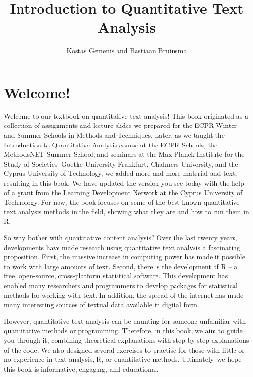 \documentclass[
]{book}
\title{Introduction to Quantitative Text Analysis}
\author{Kostas Gemenis and Bastiaan Bruinsma}
\date{}
\begin{document}
\maketitle

{
\setcounter{tocdepth}{1}
\tableofcontents
}
\chapter*{Welcome!}\label{welcome}

Welcome to our textbook on quantitative text analysis! This book originated as a collection of assignments and lecture slides we prepared for the ECPR Winter and Summer Schools in Methods and Techniques. Later, as we taught the Introduction to Quantitative Analysis course at the ECPR Schools, the MethodsNET Summer School, and seminars at the Max Planck Institute for the Study of Societies, Goethe University Frankfurt, Chalmers University, and the Cyprus University of Technology, we added more and more material and text, resulting in this book. We have updated the version you see today with the help of a grant from the \href{https://ldn.cut.ac.cy/}{Learning Development Network} at the Cyprus University of Technology. For now, the book focuses on some of the best-known quantitative text analysis methods in the field, showing what they are and how to run them in R.

So why bother with quantitative content analysis? Over the last twenty years, developments have made research using quantitative text analysis a fascinating proposition. First, the massive increase in computing power has made it possible to work with large amounts of text. Second, there is the development of R -- a free, open-source, cross-platform statistical software. This development has enabled many researchers and programmers to develop packages for statistical methods for working with text. In addition, the spread of the internet has made many interesting sources of textual data available in digital form.

However, quantitative text analysis can be daunting for someone unfamiliar with quantitative methods or programming. Therefore, in this book, we aim to guide you through it, combining theoretical explanations with step-by-step explanations of the code. We also designed several exercises to practise for those with little or no experience in text analysis, R, or quantitative methods. Ultimately, we hope this book is informative, engaging, and educational.
\end{document}
